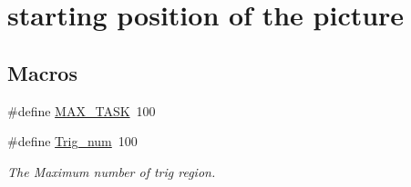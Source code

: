 \hypertarget{group___the}{}\section{starting position of the picture}
\label{group___the}
\subsection*{Macros}
\begin{DoxyCompactItemize}
\item 
\#define \hyperlink{group___the_gaeea0462bd5cef9250c58b8d66da810be}{M\+A\+X\+\_\+\+T\+A\+SK}~100
\item 
\mbox{\label{group___the_ga3572c6451d34aaf557cfb88ee365cf16}} 
\#define \hyperlink{group___the_ga3572c6451d34aaf557cfb88ee365cf16}{Trig\+\_\+num}~100
\begin{DoxyCompactList}\small\item\em The Maximum number of trig region. \end{DoxyCompactList}\end{DoxyCompactItemize}
